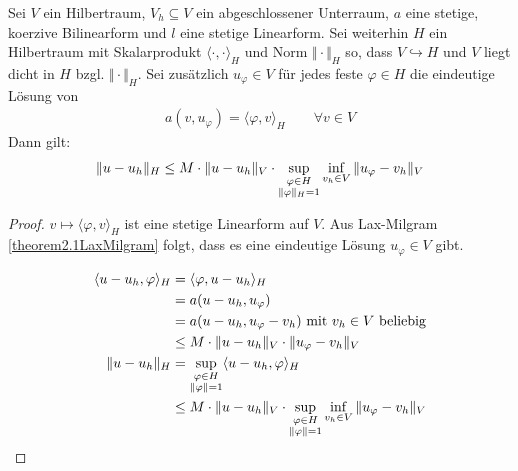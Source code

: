 \begin{theorem}\enter
Sei $V$ ein Hilbertraum, $V_h\subseteq V$ ein abgeschlossener Unterraum, $a$ eine stetige, koerzive Bilinearform und $l$ eine stetige Linearform. Sei weiterhin $H$ ein Hilbertraum mit Skalarprodukt $\langle\cdot,\cdot\rangle_H$ und Norm $\Vert\cdot\Vert_H$ so, dass $V\hookrightarrow H$ und $V$ liegt dicht in $H$ bzgl. $\Vert\cdot\Vert_H$. Sei zusätzlich $u_\varphi\in V$ für jedes feste $\varphi\in H$ die eindeutige Lösung von
\begin{align}\label{Dtheorem2.3}\tag{D}
a(v,u_\varphi)=\langle\varphi,v\rangle_H\qquad\forall v\in V
\end{align}
Dann gilt:
\begin{align*}
\Vert u-u_h\Vert_H\leq M\cdot\Vert u-u_h\Vert_V\cdot\sup\limits_{\begin{subarray}{c}\varphi\in H\\\Vert\varphi\Vert_H=1\end{subarray}}\inf\limits_{v_h\in V}\Vert u_\varphi-v_h\Vert_V
\end{align*}
\end{theorem}

\begin{proof}
$v\mapsto\langle\varphi,v\rangle_H$ ist eine stetige Linearform auf $V$. Aus Lax-Milgram \ref{theorem2.1LaxMilgram} folgt, dass es eine eindeutige Lösung $u_\varphi\in V$ gibt.
 
\begin{align*}
\langle u-u_h,\varphi\rangle_H
&=\langle\varphi,u-u_h\rangle_H\\
&=a(u-u_h,u_\varphi)\\
&=a(u-u_h,u_\varphi-v_h)\mit v_h\in V\text{ beliebig}\\
&\leq M\cdot\Vert u-u_h\Vert_V\cdot\Vert u_\varphi-v_h\Vert_V\\
\Vert u-u_h\Vert_H
&=\sup\limits_{\begin{subarray}{c}\varphi\in H\\\Vert\varphi\Vert=1\end{subarray}}\langle u-u_h,\varphi\rangle_H\\
&\leq M\cdot\Vert u-u_h\Vert_V\cdot\sup\limits_{\begin{subarray}{c}\varphi\in H\\\Vert\varphi\Vert=1\end{subarray}}\inf\limits_{v_h\in V}\Vert u_\varphi-v_h\Vert_V
\end{align*}
\end{proof}

